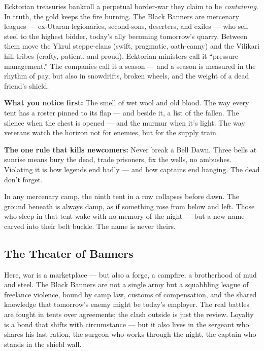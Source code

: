 \vspace{2mm}
\begin{tcolorbox}[colback=black!3,colframe=blue!60!black,title={Condotta \& Crowns},breakable]
Ecktorian treasuries bankroll a perpetual border-war they claim to be \emph{containing}. In truth, the gold keeps the fire burning. The Black Banners are mercenary leagues --- ex-Utaran legionaries, second-sons, deserters, and exiles --- who sell steel to the highest bidder, today's ally becoming tomorrow's quarry. Between them move the Ykrul steppe-clans (swift, pragmatic, oath-canny) and the Vilikari hill tribes (crafty, patient, and proud). Ecktorian ministers call it ``pressure management.'' The companies call it a season --- and a season is measured in the rhythm of pay, but also in snowdrifts, broken wheels, and the weight of a dead friend's shield.

\vspace{2mm}
\textbf{What you notice first:} The smell of wet wool and old blood. The way every tent has a roster pinned to its flap --- and beside it, a list of the fallen. The silence when the chest is opened --- and the murmur when it's light. The way veterans watch the horizon not for enemies, but for the supply train.

\textbf{The one rule that kills newcomers:} Never break a Bell Dawn. Three bells at sunrise means bury the dead, trade prisoners, fix the wells, no ambushes. Violating it is how legends end badly --- and how captains end hanging. The dead don't forget.
\end{tcolorbox}

\begin{tcolorbox}[colback=black!3,colframe=red!60!black,title={The Ninth Taboo Manifestation},breakable]
In any mercenary camp, the ninth tent in a row collapses before dawn. The ground beneath is always damp, as if something rose from below and left. Those who sleep in that tent wake with no memory of the night --- but a new name carved into their belt buckle. The name is never theirs.
\end{tcolorbox}

\subsection*{The Theater of Banners}

Here, war is a marketplace --- but also a forge, a campfire, a brotherhood of mud and steel. The Black Banners are not a single army but a squabbling league of freelance violence, bound by camp law, customs of compensation, and the shared knowledge that tomorrow's enemy might be today's employer. The real battles are fought in tents over agreements; the clash outside is just the review. Loyalty is a bond that shifts with circumstance --- but it also lives in the sergeant who shares his last ration, the surgeon who works through the night, the captain who stands in the shield wall.

